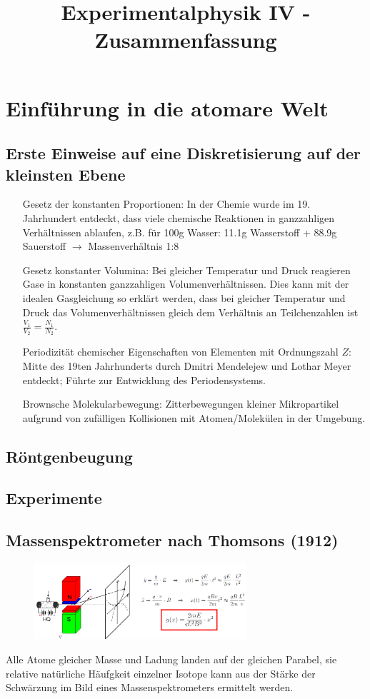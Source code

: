 \documentclass[twocolumn]{summery_4.0}
\title{Experimentalphysik IV - Zusammenfassung}
\begin{document}
\maketitle
\tableofcontents

\section{Einführung in die atomare Welt}
\subsection{Erste Einweise auf eine Diskretisierung auf der kleinsten Ebene}
\begin{itemize}
    \item[Gesetz der konstanten Proportionen:] In der Chemie wurde im 19. Jahrhundert entdeckt, dass viele chemische Reaktionen in ganzzahligen Verhältnissen ablaufen, z.B. für 100g Wasser: 11.1g Wasserstoff + 88.9g Sauerstoff $\to$ Massenverhältnis 1:8 
    \item[Gesetz konstanter Volumina:] Bei gleicher Temperatur und Druck reagieren Gase in konstanten ganzzahligen Volumenverhältnissen. Dies kann mit der idealen Gasgleichung so erklärt werden, dass bei gleicher Temperatur und Druck das  Volumenverhältnissen gleich dem Verhältnis an Teilchenzahlen ist $\frac{V_1}{V_2} = \frac{N_1}{N_2}$.
    \item[Periodizität chemischer Eigenschaften von Elementen mit Ordnungszahl $Z$:] Mitte des 19ten Jahrhunderts durch Dmitri Mendelejew und Lothar
    Meyer entdeckt; Führte zur Entwicklung des Periodensystems.
    \item[Brownsche Molekularbewegung:] Zitterbewegungen kleiner Mikropartikel aufgrund von zufälligen Kollisionen mit Atomen/Molekülen in der Umgebung.
\end{itemize}

\subsection{Röntgenbeugung}

\subsection{Experimente}
\subsection{Massenspektrometer nach Thomsons (1912)}
\begin{figure}[H]
    \centering
    \includegraphics[width=0.7\textwidth]{massenspektrometer_nach_thomson.png}
\end{figure}
Alle Atome gleicher Masse und Ladung landen auf der gleichen Parabel, sie relative natürliche Häufgkeit einzelner Isotope kann aus der Stärke der Schwärzung im Bild eines Massenspektrometers ermittelt werden.
\end{document}
